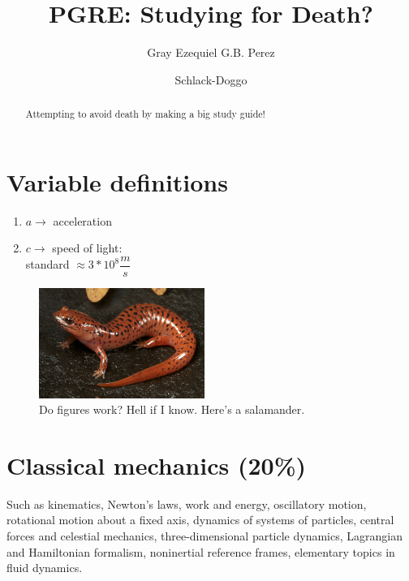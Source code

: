 \documentclass[%
 reprint,
superscriptaddress,
 amsmath,amssymb,
 aps,
prc,
]{revtex4-1}
\begin{document}

\title{PGRE: Studying for Death?}%

\author{Gray Ezequiel G.B. Perez}
\author{Schlack-Doggo}
%

\begin{abstract}
Attempting to avoid death by making a big study guide!
\end{abstract}
\maketitle
\tableofcontents
\section{Variable definitions}
\begin{enumerate}
\item[] $a\rightarrow$ acceleration

\item[] $c\rightarrow$ speed of light:\\
standard  $\approx 3*10^8\dfrac{m}{s}$

\end{enumerate}

\begin{figure}[t]
	\centering
	\includegraphics[width=0.48\textwidth]{figures/sally}
	\caption{Do figures work? Hell if I know. Here's a salamander.}
	\label{fig:sally}
\end{figure}

\section{Classical mechanics (20\%)}
Such as kinematics, Newton's laws, work and energy, oscillatory motion, rotational motion about a fixed axis, dynamics of systems of particles, central forces and celestial mechanics, three-dimensional particle dynamics, Lagrangian and Hamiltonian formalism, noninertial reference frames, elementary topics in fluid dynamics.
\end{document}
